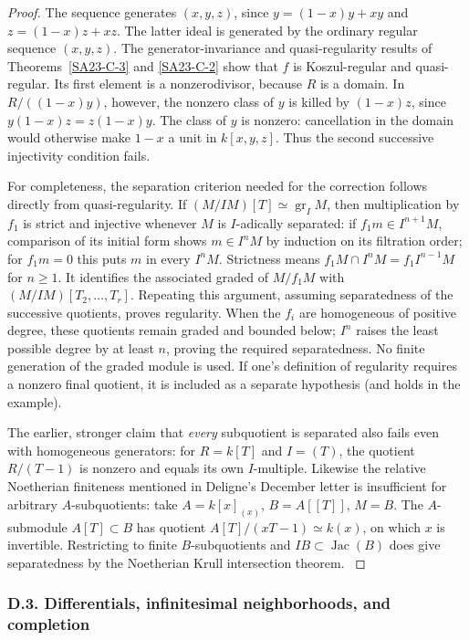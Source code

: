 \begin{proof}
The sequence generates $(x,y,z)$, since
$y=(1-x)y+xy$ and $z=(1-x)z+xz$.  The latter ideal is generated
by the ordinary regular sequence $(x,y,z)$.  The generator-invariance
and quasi-regularity results of
Theorems~\ref{SA23-C-3} and \ref{SA23-C-2} show that $f$ is
Koszul-regular and quasi-regular.  Its first element is a
nonzerodivisor, because $R$ is a domain.  In
$R/((1-x)y)$, however, the nonzero class of $y$ is killed by
$(1-x)z$, since $y(1-x)z=z(1-x)y$.
The class of $y$ is nonzero: cancellation in the domain would
otherwise make $1-x$ a unit in $k[x,y,z]$.  Thus the second
successive injectivity condition fails.

For completeness, the separation criterion needed for the correction
follows directly from quasi-regularity.  If
$(M/IM)[T]\simeq\operatorname{gr}_I M$, then multiplication by
$f_1$ is strict and injective whenever $M$ is $I$-adically separated:
if $f_1m\in I^{n+1}M$, comparison of its initial form shows
$m\in I^nM$ by induction on its filtration order; for
$f_1m=0$ this puts $m$ in every $I^nM$.  Strictness means
$f_1M\cap I^nM=f_1 I^{n-1}M$ for $n\geq1$.
It identifies the associated graded of $M/f_1M$ with
$(M/IM)[T_2,\ldots,T_r]$.  Repeating this argument, assuming
separatedness of the successive quotients, proves regularity.
When the $f_i$ are homogeneous of positive degree, these quotients
remain graded and bounded below; $I^n$ raises the least possible
degree by at least $n$, proving the required separatedness.
No finite generation of the graded module is used.  If one's
definition of regularity requires a nonzero final quotient, it is
included as a separate hypothesis (and holds in the example).

The earlier, stronger claim that \emph{every} subquotient is separated
also fails even with homogeneous generators: for $R=k[T]$ and
$I=(T)$, the quotient $R/(T-1)$ is nonzero and equals its own
$I$-multiple.  Likewise the relative Noetherian finiteness mentioned
in Deligne's December letter is insufficient for arbitrary
$A$-subquotients: take $A=k[x]_{(x)}$, $B=A[[T]]$, $M=B$.
The $A$-submodule $A[T]\subset B$ has quotient
$A[T]/(xT-1)\simeq k(x)$, on which $x$ is invertible.  Restricting
to finite $B$-subquotients and $IB\subset\operatorname{Jac}(B)$
does give separatedness by the Noetherian Krull intersection theorem.
\cite[Lemma 10.51.5(2)]{algStacksKrull}
\end{proof}

\subsubsection{D.3. Differentials, infinitesimal neighborhoods, and completion}

